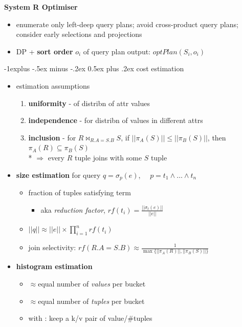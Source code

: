 \documentclass[10pt, landscape]{article}
\makeatletter
\renewcommand{\subsection}{\@startsection{subsection}{2}{0mm}%
  {-1explus -.5ex minus -.2ex}%
  {0.5ex plus .2ex}%
{\normalfont\normalsize\bfseries}}
\makeatother
\begin{document}
\begin{multicols*}{4}
  \textbf{System R Optimiser}

  \begin{itemize}
    \item enumerate only left-deep query plans; avoid cross-product query plans; consider early selections and projections
    \item DP + \textbf{sort order} $o_i$ of query plan output: $optPlan(S_i, o_i)$
  \end{itemize}

  \subsection{cost estimation}

  \begin{itemize}
    \item estimation assumptions
      \begin{enumerate}
        \item \textbf{uniformity} - of distribn of attr values
        \item \textbf{independence} - for distribn of values in different attrs
        \item \textbf{inclusion} - for $R \bowtie_{R.A=S.B}S$, if $||\pi_A(S)|| \leq ||\pi_B(S)||$, then $\pi_A(R) \subseteq \pi_B(S)$ 
          \\* $\Rightarrow$ every $R$ tuple joins with some $S$ tuple
      \end{enumerate}
    \item \textbf{size estimation} for query $q = \sigma_p(e)$,  $\quad p = t_1 \land \dots \land t_n$
      \begin{itemize}
        \item {} fraction of tuples satisfying term
          \begin{itemize}
            \item aka \textit{reduction factor}, $rf(t_i) = \frac{||\sigma_t(e)||}{||e||}$
          \end{itemize}
        \item $||q|| \approx ||e|| \times \prod^n_{i=1}rf(t_i)$
        \item join selectivity: $rf(R.A=S.B) \approx \frac{1}{\max\{||\pi_A(R)||, ||\pi_B(S)||\}}$
      \end{itemize}
    \item \textbf{histogram estimation}
      \begin{itemize}
        \item {} $\approx$equal number of \textit{values} per bucket
        \item {} $\approx$equal number of \textit{tuples} per bucket
        \item with : keep a k/v pair of value/\#tuples
      \end{itemize}
  \end{itemize}


\end{multicols*}
\end{document}

